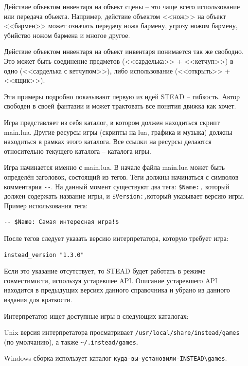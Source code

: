\documentclass[12pt]{article}
\begin{document}
Действие объектом инвентаря на объект сцены -- это чаще всего использование или передача объекта. Например, действие объектом <<нож>> на объект <<бармен>> может означать передачу ножа бармену, угрозу ножом бармену, убийство ножом бармена и многое другое.

Действие объектом инвентаря на объект инвентаря понимается так же свободно. Это может быть соединение предметов (<<сарделька>> + <<кетчуп>>) в одно (<<сарделька с кетчупом>>), либо использование (<<открыть>> + <<ящик>>).

Эти примеры подробно показывают первую из идей STEAD -- гибкость. Автор свободен в своей фантазии и может трактовать все понятия движка как хочет.

Игра представляет из себя каталог, в котором должен находиться скрипт main.lua. Другие ресурсы игры (скрипты на lua, графика и музыка) должны находиться в рамках этого каталога. Все ссылки на ресурсы делаются относительно текущего каталога -- каталога игры.

Игра начинается именно с main.lua. В начале файла main.lua может быть определён заголовок, состоящий из тегов. Теги должны начинаться с символов комментария \verb/--/. На данный момент существуют два тега: \verb/$Name:,/ который должен содержать название игры, и \verb/$Version:,/который указывает версию игры. Пример использования тега:

\begin{verbatim}
-- $Name: Самая интересная игра!$
\end{verbatim}

После тегов следует указать версию интерпретатора, которую требует игра:

\begin{verbatim}
instead_version "1.3.0"
\end{verbatim}

Если это указание отсутствует, то STEAD будет работать в режиме совместимости, используя устаревшее API. Описание устаревшего API находится в предыдущих версиях данного справочника и убрано из данного издания для краткости.

Интерпретатор ищет доступные игры в следующих каталогах:

Unix версия интерпретатора просматривает \verb;/usr/local/share/instead/games; (по умолчанию), а также \verb,~/.instead/games,.

Windows сборка использует каталог \verb/куда-вы-установили-INSTEAD\games/.
\end{document}
